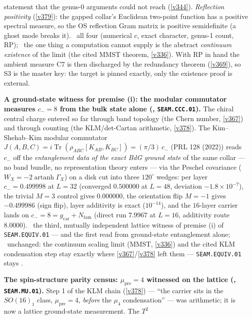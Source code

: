 \documentclass[11pt,a4paper]{article}
\newcommand{\Nfam}{N_{\mathrm{fam}}}
\newcommand{\gcar}{g_{\mathrm{car}}}
\begin{document}
\begin{keybox}
statement that the genus-0 arguments could not reach (\vref{v344}). \emph{Reflection positivity}
(\vref{v379}): the gapped collar's Euclidean two-point function has a positive spectral measure, so the OS
reflection Gram matrix is positive semidefinite (a ghost mode breaks it). \mE\ all four (numerical $c$,
exact character, genus-1 count, RP); \mO\ the one thing a computation cannot supply is the abstract
\emph{continuum existence} of the limit (the cited MMST theorem, \vref{v336}). With RP in hand the ambient
measure C7 is then discharged by the redundancy theorem (\vref{v369}), so S3 is the master key: the target
is pinned exactly, only the existence proof is external.
\par\smallskip\noindent\textbf{A ground-state witness for premise (i): the modular commutator measures
$c_-{=}8$ from the bulk state alone (, \texttt{SEAM.CCC.01}).}
The chiral central charge entered so far through band topology (the Chern number, \vref{v367}) and through
counting (the KLM/det-Cartan arithmetic, \vref{v378}). The Kim--Shehab--Kim modular commutator
$J(A,B,C)=i\operatorname{Tr}(\rho_{ABC}[K_{AB},K_{BC}])=(\pi/3)\,c_-$ (PRL 128 (2022)) reads $c_-$ off the
\emph{entanglement data of the exact BdG ground state} of the same collar --- no band bundle, no
representation theory enters --- via the Peschel covariance ($W_X=-2\operatorname{artanh}\Gamma_X$) on a
disk cut into three $120^\circ$ wedges: per layer $c_-=0.499998$ at $L{=}32$ (converged $0.500000$ at
$L{=}48$, deviation $-1.8\times10^{-7}$), the trivial $M{=}3$ control gives $0.000000$, the orientation
flip $M{=}{-}1$ gives $-0.499986$ (sign flip), layer additivity is exact ($10^{-14}$), and the $16$-layer
carrier lands on $c_-=8=\gcar+\Nfam$ (direct run $7.9967$ at $L{=}16$, additivity route $8.0000$). \mE\ the
third, mutually independent lattice witness of premise (i) of \texttt{SEAM.EQUIV.01} --- and the first read
from ground-state entanglement alone; \mO\ unchanged: the continuum scaling limit (MMST, \vref{v336}) and
the cited KLM condensation step stay exactly where \vref{v367}/\vref{v378} left them ---
\texttt{SEAM.EQUIV.01} stays \mO.
\par\smallskip\noindent\textbf{The spin-structure parity census: $\mu_{\mathrm{pre}}{=}4$ witnessed on the
lattice (, \texttt{SEAM.MU.01}).} Step 1 of the KLM chain
(\vref{v378}) --- ``the carrier sits in the $SO(16)_1$ class, $\mu_{\mathrm{pre}}{=}4$, \emph{before} the
$\mu_4$ condensation'' --- was arithmetic; it is now a lattice ground-state measurement. The $T^2$

\end{keybox}
\end{document}
